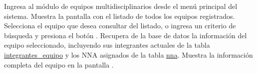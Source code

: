 \begin{UCtrayectoria}
	\UCpaso[\UCactor] Ingresa al módulo de equipos multidisciplinarios desde el menú principal del sistema.
	\UCpaso Muestra la pantalla  con el listado de todos los equipos registrados. 
	\UCpaso[\UCactor] \label{CU-10.selecciona} Selecciona el equipo que desea consultar del listado, o ingresa un criterio de búsqueda y presiona el botón . 
	\UCpaso Recupera de la base de datos la información del equipo seleccionado, incluyendo sus integrantes actuales de la tabla \hyperlink{IntegrantesEquipo}{integrantes\_equipo} y los NNA asignados de la tabla \hyperlink{NNA}{nna}.
	\UCpaso Muestra la información completa del equipo en la pantalla .
\end{UCtrayectoria}
